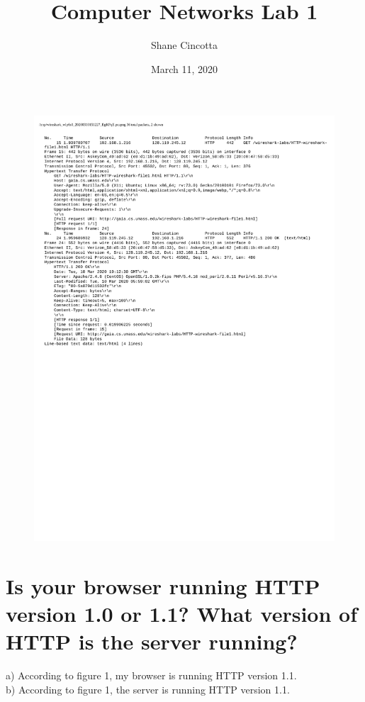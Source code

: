 \documentclass{article}
\title{Computer Networks Lab 1}
\author{Shane Cincotta }
\date{March 11, 2020}
\begin{document}
\maketitle

\begin{figure}[h!]
\centering
\includegraphics[scale=0.65]{Q1-7Output.pdf}
\caption{}
\end{figure}
\section{Is your browser running HTTP version 1.0 or 1.1? What version of HTTP is the
server running?}
a)  According to figure 1, my browser is running HTTP version 1.1.\\
\newline b)  According to figure 1, the server is running HTTP version 1.1.\\
\end{document}
